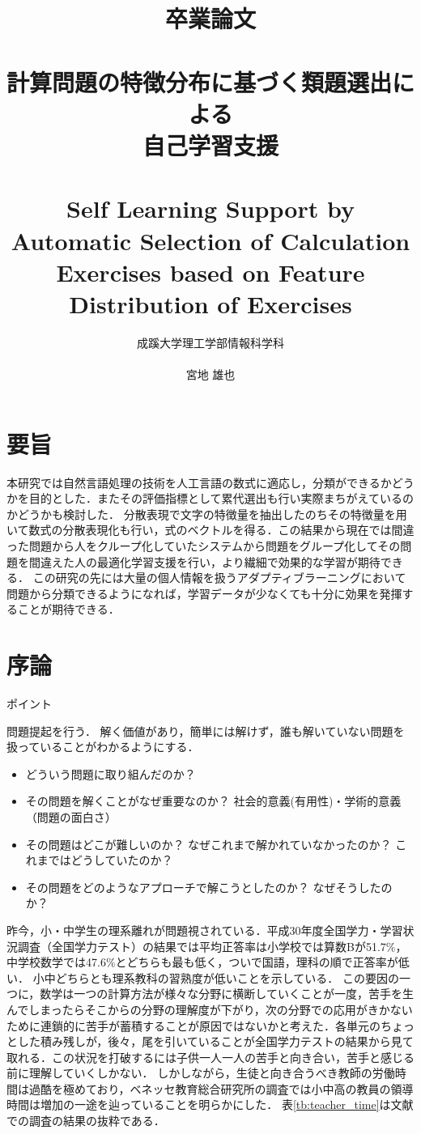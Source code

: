 \documentclass[a4j,11pt,report]{jsbook}
\title{卒業論文\\　\vspace{3em}\\{\huge #1}\\　\\#2\vspace{15em}}%
\author{{\huge 成蹊大学理工学部情報科学科}\\　\\{\huge #3}}%
\date{}
\newcommand{\frontpage}[3]{%
\title{卒業論文\\　\vspace{3em}\\{\huge #1}\\　\\#2\vspace{15em}}%
\author{{\huge 成蹊大学理工学部情報科学科}\\　\\{\huge #3}}%
\date{}
\maketitle
\clearpage
\thispagestyle{empty}

\clearpage
}
\newcommand{\point}[1]{
\begin{itembox}[l]{ポイント}
  #1
\end{itembox}
}
\begin{document}
\frontpage  %
{計算問題の特徴分布に基づく類題選出による\leavevmode \\ 自己学習支援}
{Self Learning Support by Automatic Selection of Calculation Exercises based on Feature Distribution of Exercises}
{宮地 雄也}



\chapter*{要旨}
\thispagestyle{empty}

本研究では自然言語処理の技術を人工言語の数式に適応し，分類ができるかどうかを目的とした．またその評価指標として累代選出も行い実際まちがえているのかどうかも検討した．
分散表現で文字の特徴量を抽出したのちその特徴量を用いて数式の分散表現化も行い，式のベクトルを得る．この結果から現在では間違った問題から人をクループ化していたシステムから問題をグループ化してその問題を間違えた人の最適化学習支援を行い，より繊細で効果的な学習が期待できる．
この研究の先には大量の個人情報を扱うアダプティブラーニングにおいて問題から分類できるようになれば，学習データが少なくても十分に効果を発揮することが期待できる．


\tableofcontents
\thispagestyle{empty}
\clearpage
\thispagestyle{plain}
\setcounter{page}{1}

\chapter{序論 \label{ch:introduction}}

\point{
問題提起を行う．
解く価値があり，簡単には解けず，誰も解いていない問題を扱っていることがわかるようにする．
\begin{itemize}
  \item どういう問題に取り組んだのか？
  \item その問題を解くことがなぜ重要なのか？ 社会的意義(有用性)・学術的意義（問題の面白さ）
  \item その問題はどこが難しいのか？ なぜこれまで解かれていなかったのか？ これまではどうしていたのか？
  \item その問題をどのようなアプローチで解こうとしたのか？ なぜそうしたのか？
\end{itemize}
}
\fi

昨今，小・中学生の理系離れが問題視されている．平成30年度全国学力・学習状況調査（全国学力テスト）の結果では平均正答率は小学校では算数Bが51.7\%，中学校数学では47.6\%とどちらも最も低く，ついで国語，理科の順で正答率が低い．
小中どちらとも理系教科の習熟度が低いことを示している．
この要因の一つに，数学は一つの計算方法が様々な分野に横断していくことが一度，苦手を生んでしまったらそこからの分野の理解度が下がり，次の分野での応用がきかないために連鎖的に苦手が蓄積することが原因ではないかと考えた．各単元のちょっとした積み残しが，後々，尾を引いていることが全国学力テストの結果から見て取れる．この状況を打破するには子供一人一人の苦手と向き合い，苦手と感じる前に理解していくしかない．
しかしながら，生徒と向き合うべき教師の労働時間は過酷を極めており，ベネッセ教育総合研究所の調査では小中高の教員の領導時間は増加の一途を辿っていることを明らかにした．
表\ref{tb:teacher_time}は文献\cite{benesse_DateBook}での調査の結果の抜粋である．
\end{document}
